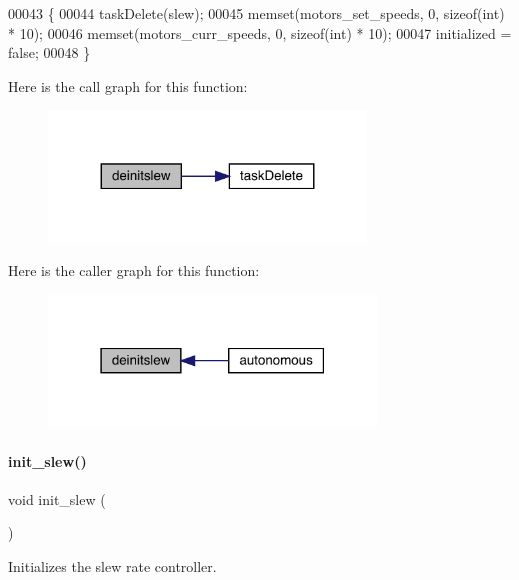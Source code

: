 \begin{DoxyCode}
00043                  \{
00044   taskDelete(slew);
00045   memset(motors_set_speeds, 0, \textcolor{keyword}{sizeof}(\textcolor{keywordtype}{int}) * 10);
00046   memset(motors_curr_speeds, 0, \textcolor{keyword}{sizeof}(\textcolor{keywordtype}{int}) * 10);
00047   initialized = \textcolor{keyword}{false};
00048 \}
\end{DoxyCode}
Here is the call graph for this function\+:\nopagebreak
\begin{figure}[H]
\begin{center}
\leavevmode
\includegraphics[width=239pt]{slew_8c_a981c9990a969d2587e66e550737f7cd9_cgraph}
\end{center}
\end{figure}
Here is the caller graph for this function\+:\nopagebreak
\begin{figure}[H]
\begin{center}
\leavevmode
\includegraphics[width=247pt]{slew_8c_a981c9990a969d2587e66e550737f7cd9_icgraph}
\end{center}
\end{figure}
\mbox{\label{slew_8c_a321758941d88b75783955c819bb75005}} 
\paragraph{init\+\_\+slew()}
{\footnotesize\ttfamily void init\+\_\+slew (\begin{DoxyParamCaption}{ }\end{DoxyParamCaption})}



Initializes the slew rate controller. 

